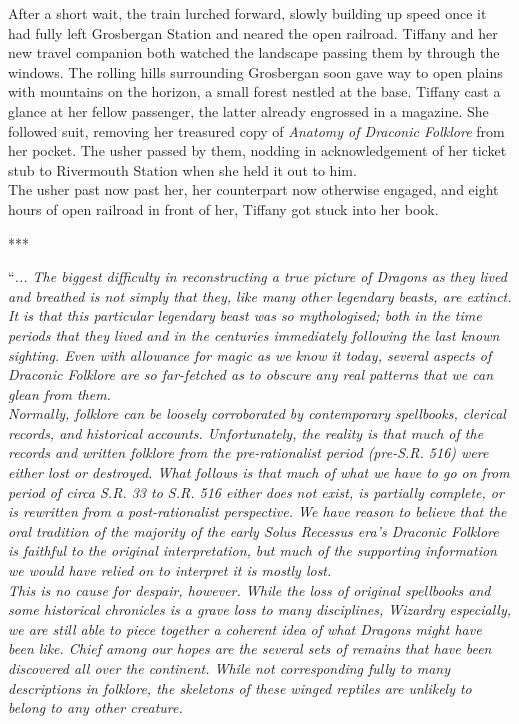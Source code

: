 After a short wait, the train lurched forward, slowly building up speed once it had fully left Grosbergan Station and neared the open railroad.
Tiffany and her new travel companion both watched the landscape passing them by through the windows.
The rolling hills surrounding Grosbergan soon gave way to open plains with mountains on the horizon, a small forest nestled at the base.
Tiffany cast a glance at her fellow passenger, the latter already engrossed in a magazine.
She followed suit, removing her treasured copy of \textit{Anatomy of Draconic Folklore} from her pocket.
The usher passed by them, nodding in acknowledgement of her ticket stub to Rivermouth Station when she held it out to him.\\

The usher past now past her, her counterpart now otherwise engaged, and eight hours of open railroad in front of her, Tiffany got stuck into her book.\\

\begin{center}
    ***
\end{center}

``\textit{... The biggest difficulty in reconstructing a true picture of Dragons as they lived and breathed is not simply that they, like many other legendary beasts, are extinct. It is that this particular legendary beast was so mythologised; both in the time periods that they lived and in the centuries immediately following the last known sighting. Even with allowance for magic as we know it today, several aspects of Draconic Folklore are so far-fetched as to obscure any real patterns that we can glean from them.}\\

\textit{Normally, folklore can be loosely corroborated by contemporary spellbooks, clerical records, and historical accounts. Unfortunately, the reality is that much of the records and written folklore from the pre-rationalist period (pre-S.R. 516) were either lost or destroyed. What follows is that much of what we have to go on from period of circa S.R. 33 to S.R. 516 either does not exist, is partially complete, or is rewritten from a post-rationalist perspective. We have reason to believe that the oral tradition of the majority of the early Solus Recessus era's Draconic Folklore is faithful to the original interpretation, but much of the supporting information we would have relied on to interpret it is mostly lost.}\\

\textit{This is no cause for despair, however. While the loss of original spellbooks and some historical chronicles is a grave loss to many disciplines, Wizardry especially, we are still able to piece together a coherent idea of what Dragons might have been like. Chief among our hopes are the several sets of remains that have been discovered all over the continent. While not corresponding fully to many descriptions in folklore, the skeletons of these winged reptiles are unlikely to belong to any other creature.}\\

